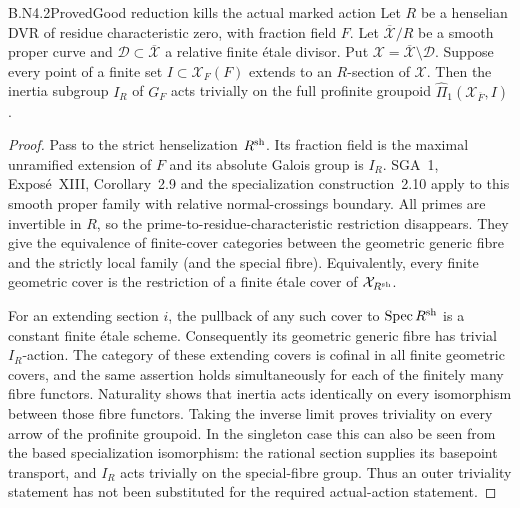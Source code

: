 \begin{claim}{B.N4.2}{Proved}{Good reduction kills the actual marked action}
Let $R$ be a henselian DVR of residue characteristic zero, with fraction
field $F$.  Let $\overline{\mathcal X}/R$ be a smooth proper curve and
$\mathcal D\subset\overline{\mathcal X}$ a relative finite \'etale
divisor.  Put $\mathcal X=\overline{\mathcal X}\setminus\mathcal D$.
Suppose every point of a finite set $I\subset\mathcal X_F(F)$ extends
to an $R$-section of $\mathcal X$.  Then the inertia subgroup $I_R$ of
$G_F$ acts trivially on the full profinite groupoid
$\widehat\Pi_1(\mathcal X_{\overline F},I)$.
\end{claim}
\begin{proof}
Pass to the strict henselization $R^{\rm sh}$.  Its fraction field is
the maximal unramified extension of $F$ and its absolute Galois group
is $I_R$.  SGA~1, Expos\'e~XIII, Corollary~2.9 and the specialization
construction~2.10 apply to this smooth proper family with relative
normal-crossings boundary.  All primes are invertible in $R$, so the
prime-to-residue-characteristic restriction disappears.  They give the
equivalence of finite-cover categories between the geometric generic
fibre and the strictly local family (and the special fibre).  Equivalently,
every finite geometric cover is the restriction of a finite \'etale
cover of $\mathcal X_{R^{\rm sh}}$.

For an extending section $i$, the pullback of any such cover to
$\operatorname{Spec}R^{\rm sh}$ is a constant finite \'etale scheme.
Consequently its geometric generic fibre has trivial $I_R$-action.
The category of these extending covers is cofinal in all finite
geometric covers, and the same assertion holds simultaneously for each
of the finitely many fibre functors.  Naturality shows that inertia acts
identically on every isomorphism between those fibre functors.  Taking
the inverse limit proves triviality on every arrow of the profinite
groupoid.  In the singleton case this can also be seen from the based
specialization isomorphism: the rational section supplies its basepoint
transport, and $I_R$ acts trivially on the special-fibre group.
Thus an outer triviality statement has not been substituted for the
required actual-action statement.
\end{proof}

